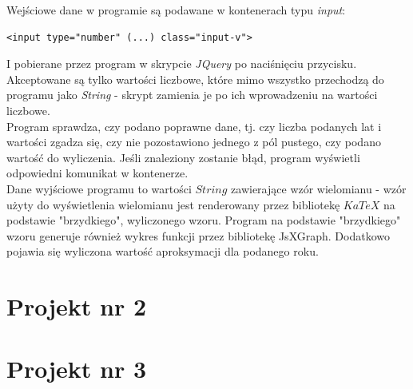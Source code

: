 \documentclass[a4paper,12pt]{article}
\newcommand{\id}{\noindent}
\begin{document}
\id
Wejściowe dane w programie są podawane w kontenerach typu \textit{input}: \\

\begin{lstlisting}
<input type="number" (...) class="input-v">
\end{lstlisting} 

\id
I pobierane przez program w skrypcie \textit{JQuery} po naciśnięciu przycisku. Akceptowane są tylko wartości liczbowe, które mimo wszystko przechodzą do programu jako \textit{String} - skrypt zamienia je po ich wprowadzeniu na wartości liczbowe. \\

\id
Program sprawdza, czy podano poprawne dane, tj. czy liczba podanych lat i wartości zgadza się, czy nie pozostawiono jednego z pól pustego, czy podano wartość do wyliczenia. Jeśli znaleziony zostanie błąd, program wyświetli odpowiedni komunikat w kontenerze. \\

\id
Dane wyjściowe programu to wartości $String$ zawierające wzór wielomianu - wzór użyty do wyświetlenia wielomianu jest renderowany przez bibliotekę $KaTeX$ na podstawie "brzydkiego", wyliczonego wzoru. Program na podstawie "brzydkiego" wzoru generuje również wykres funkcji przez bibliotekę JsXGraph. Dodatkowo pojawia się wyliczona wartość aproksymacji dla podanego roku. 

\section{Projekt nr 2}

\section{Projekt nr 3}
\end{document}
